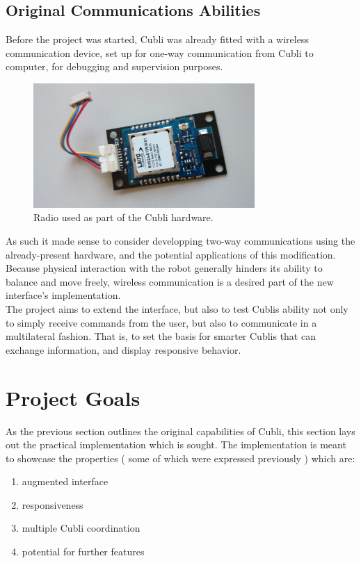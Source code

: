 \subsection{Original Communications Abilities}

Before the project was started, Cubli was already fitted with a wireless communication device, set up for one-way communication from Cubli to computer, for debugging and supervision purposes.\\

\begin{figure}[ht]
   \centering
   \includegraphics[width=0.75\textwidth]{img/LAIRD-radio.jpg}
   \caption{Radio used as part of the Cubli hardware.}
   \label{img:LAIRD-radio}
\end{figure}

As such it made sense to consider developping two-way communications using the already-present hardware, and the potential applications of this modification.\\ 

Because physical interaction with the robot generally hinders its ability to balance and move freely, wireless communication is a desired part of the new interface's implementation.\\

The project aims to extend the interface, but also to test Cublis ability not only to simply receive commands from the user, but also to communicate in a multilateral fashion. That is, to set the basis for smarter Cublis that can exchange information, and display responsive behavior. 

\section{Project Goals}

As the previous section outlines the original capabilities of Cubli, this section lays out the practical implementation which is sought. The implementation is meant to showcase the properties ( some of which were expressed previously ) which are:
\begin{enumerate}
\item augmented interface
\item responsiveness
\item multiple Cubli coordination
\item potential for further features
\end{enumerate}

